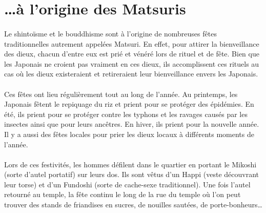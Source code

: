 \section[\ldots et les Matsuris]{\ldots à l'origine des Matsuris}

\paragraph{} Le shintoïsme et le bouddhisme sont à l'origine de nombreuses
fêtes traditionnelles autrement appelées Matsuri. En effet, pour attirer la
bienveillance des dieux, chacun d'entre eux est prié et vénéré lors de rituel
et de fête. Bien que les Japonais ne croient pas vraiment en ces dieux, ils
accomplissent ces rituels au cas où les dieux existeraient et retireraient leur
bienveillance envers les Japonais.

\paragraph{} Ces fêtes ont lieu régulièrement tout au long de l'année. Au
printemps, les Japonais fêtent le repiquage du riz et prient pour se protéger
des épidémies. En été, ils prient pour se protéger contre les typhons et les
ravages causés par les insectes ainsi que pour leurs ancêtres.  En hiver, ils
prient pour la nouvelle année. Il y a aussi des fêtes locales pour prier les
dieux locaux à différents moments de l'année.

\paragraph{} Lors de ces festivités, les hommes défilent dans le quartier en
portant le Mikoshi (sorte d'autel portatif) sur leurs dos. Ils sont vêtus d'un
Happi (veste découvrant leur torse) et d'un Fundoshi (sorte de cache-sexe
traditionnel). Une fois l'autel retourné au temple, la fête continu le long de
la rue du temple où l'on peut trouver des stands de friandises en sucres, de
nouilles sautées, de porte-bonheurs\ldots

